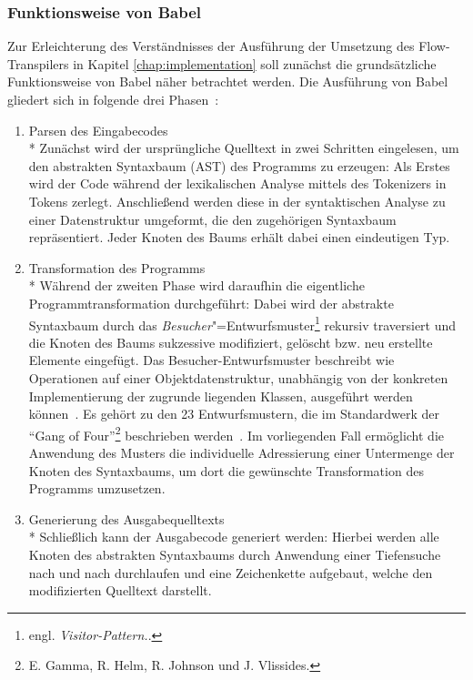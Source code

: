 \subsubsection{Funktionsweise von Babel}

Zur Erleichterung des Verständnisses der Ausführung der Umsetzung des Flow-Transpilers in Kapitel \ref{chap:implementation} soll zunächst die grundsätzliche Funktionsweise von Babel näher betrachtet werden. Die Ausführung von Babel gliedert sich in folgende drei Phasen~\autocite{BABEL:HANDBOOK}:

\begin{enumerate}
  \item {\libertineSB Parsen des Eingabecodes}\\*
    Zunächst wird der ursprüngliche Quelltext in zwei Schritten eingelesen, um den abstrakten Syntaxbaum (AST) des Programms zu erzeugen: Als Erstes wird der Code während der lexikalischen Analyse mittels des Tokenizers in Tokens zerlegt. Anschließend werden diese in der syntaktischen Analyse zu einer Datenstruktur umgeformt, die den zugehörigen Syntaxbaum repräsentiert. Jeder Knoten des Baums erhält dabei einen eindeutigen Typ.
    \\

  \item {\libertineSB Transformation des Programms}\\*
    Während der zweiten Phase wird daraufhin die eigentliche Programmtransformation durchgeführt: Dabei wird der abstrakte Syntaxbaum durch das \emph{Besucher}"=Entwurfsmuster\footnote{engl. \textit{Visitor-Pattern.}.} rekursiv traversiert und die Knoten des Baums sukzessive modifiziert, gelöscht bzw. neu erstellte Elemente eingefügt. Das Besucher-Entwurfsmuster beschreibt wie Operationen auf einer Objektdatenstruktur, unabhängig von der konkreten Implementierung der zugrunde liegenden Klassen, ausgeführt werden können~\autocite[634\psq]{FREEMAN:2004}. Es gehört zu den 23 Entwurfsmustern, die im Standardwerk  der \enquote{Gang of Four}\footnote{E. Gamma, R. Helm, R. Johnson und J. Vlissides.} beschrieben werden~\autocite[306\psqq]{GAMMA:1994}. Im vorliegenden Fall ermöglicht die Anwendung des Musters die individuelle Adressierung einer Untermenge der Knoten des Syntaxbaums, um dort die gewünschte Transformation des Programms umzusetzen.
    \\

  \item {\libertineSB Generierung des Ausgabequelltexts}\\*
    Schließlich kann der Ausgabecode generiert werden: Hierbei werden alle Knoten des abstrakten Syntaxbaums durch Anwendung einer Tiefensuche nach und nach durchlaufen und eine Zeichenkette aufgebaut, welche den modifizierten Quelltext darstellt.
\end{enumerate}

